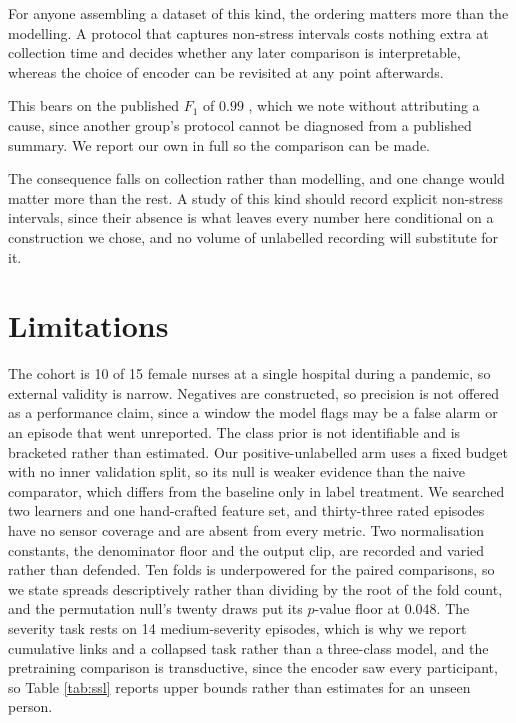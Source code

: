 \documentclass{article}
\begin{document}
For anyone assembling a dataset of this kind, the ordering matters more than
the modelling. A protocol that captures non-stress intervals costs nothing
extra at collection time and decides whether any later comparison is
interpretable, whereas the choice of encoder can be revisited at any point
afterwards.

This bears on the published $F_1$ of $0.99$ \cite{mathur2024}, which we note
without attributing a cause, since another group's protocol cannot be diagnosed
from a published summary. We report our own in full so the comparison can be
made.

The consequence falls on collection rather than modelling, and one change
would matter more than the rest. A study of this kind should record explicit
non-stress intervals, since their absence is what leaves every number here
conditional on a construction we chose, and no volume of unlabelled
recording will substitute for it.

\section{Limitations}

The cohort is 10 of 15 female nurses at a single hospital during a pandemic,
so external validity is narrow. Negatives are constructed, so precision is not
offered as a performance claim, since a window the model flags may be a
false alarm or an episode that went unreported. The class prior is
not identifiable and is bracketed rather than estimated. Our positive-unlabelled arm uses a
fixed budget with no inner validation split, so its null is weaker evidence
than the naive comparator, which differs from the baseline only in label
treatment.
We searched two learners and one hand-crafted feature set, and thirty-three
rated episodes have no sensor coverage and are absent from every metric. Two
normalisation constants, the denominator floor and the output clip, are
recorded and varied rather than defended. Ten folds is underpowered for the paired
comparisons, so we state spreads descriptively rather than dividing by the root
of the fold count, and the permutation null's twenty draws put its $p$-value
floor at $0.048$. The severity task rests on 14 medium-severity episodes, which is why we
report cumulative links and a collapsed task rather than a three-class model,
and the pretraining comparison is transductive, since the encoder saw every
participant, so Table \ref{tab:ssl} reports upper bounds rather than estimates
for an unseen person.
\end{document}
